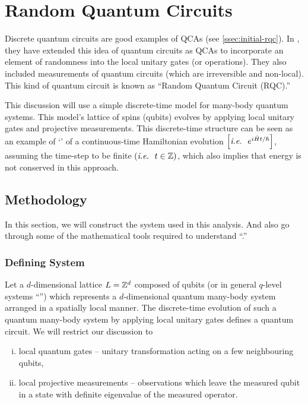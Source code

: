 \documentclass[11pt, oneside, listof=totoc]{scrbook}
\begin{document}
\chapter{Random Quantum Circuits}

Discrete quantum circuits are good examples of QCAs (see \cref{ssec:initial-rqc}). In \cite{Fisher2023}, they have extended this idea of quantum circuits as QCAs to incorporate an element of randomness into the local unitary gates (or operations). They also included measurements of quantum circuits (which are irreversible and non-local). This kind of quantum circuit is known as ``Random Quantum Circuit (RQC).''

This discussion will use a simple discrete-time model for many-body quantum systems. This model's lattice of spins (qubits) evolves by applying local unitary gates and projective measurements. This discrete-time structure can be seen as an example of `' of a continuous-time Hamiltonian evolution \(\qty[\textit{i.e.~} ~ e^{i \hat{H} t / \hslash}]\), assuming the time-step to be finite \(\qty(\textit{i.e.~} ~ t \in \mathbb Z)\), which also implies that energy is not conserved in this approach.

\section{Methodology}

In this section, we will construct the system used in this analysis. And also go through some of the mathematical tools required to understand ``.''

\subsection{Defining System}
Let a \(d\)-dimensional lattice \(L = \mathbb Z^{d}\) composed of qubits (or in general \(q\)-level systems ``'') which represents a \(d\)-dimensional quantum many-body system arranged in a spatially local manner. The discrete-time evolution of such a quantum many-body system by applying local unitary gates defines a quantum circuit. We will restrict our discussion to
\begin{enumerate}[(i), noitemsep]
    \item local quantum gates -- unitary transformation acting on a few neighbouring qubits,
    \item local projective measurements -- observations which leave the measured qubit in a state with definite eigenvalue of the measured operator.
\end{enumerate}
\end{document}
